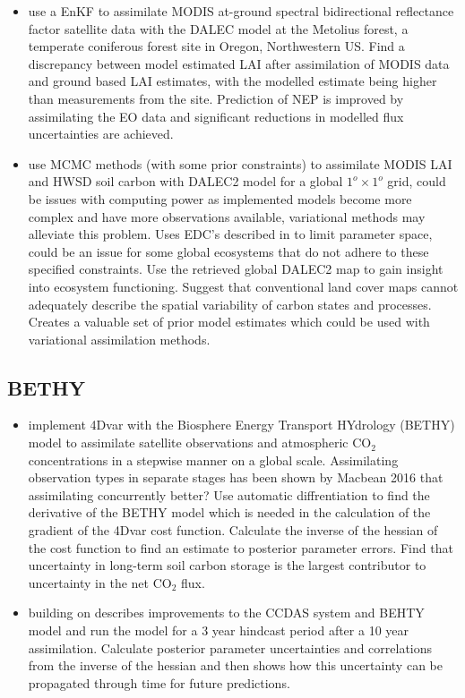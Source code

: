 \documentclass[12pt, a4paper]{article}
\begin{document}
\begin{itemize}
\item \citet{Quaife2008} use a EnKF to assimilate MODIS at-ground spectral bidirectional reflectance factor satellite data with the DALEC model at the Metolius forest, a temperate coniferous forest site in Oregon, Northwestern US. Find a discrepancy between model estimated LAI after assimilation of MODIS data and ground based LAI estimates, with the modelled estimate being higher than measurements from the site. Prediction of NEP is improved by assimilating the EO data and significant reductions in modelled flux uncertainties are achieved.    

\item \citet{bloom2016decadal} use MCMC methods (with some prior constraints) to assimilate MODIS LAI and HWSD soil carbon with DALEC2 model for a global \(1^o \times 1^o\) grid, could be issues with computing power as implemented models become more complex and have more observations available, variational methods may alleviate this problem. Uses EDC's described in \citet{Bloom2015} to limit parameter space, could be an issue for some global ecosystems that do not adhere to these specified constraints. Use the retrieved global DALEC2 map to gain insight into ecosystem functioning. Suggest that conventional land cover maps cannot adequately describe  the spatial variability of carbon states and processes. Creates a valuable set of prior model estimates which could be used with variational assimilation methods.

\end{itemize}


\subsection{BETHY}

\begin{itemize}

\item \citet{rayner2005two} implement 4Dvar with the Biosphere Energy Transport HYdrology (BETHY) model \citep{knorr2001uncertainties} to assimilate satellite observations and atmospheric CO\(_2\) concentrations in a stepwise manner on a global scale. Assimilating observation types in separate stages has been shown by Macbean 2016 that assimilating concurrently better? Use automatic diffrentiation to find the derivative of the BETHY model which is needed in the calculation of the gradient of the 4Dvar cost function. Calculate the inverse of the hessian of the cost function to find an estimate to posterior parameter errors. Find that uncertainty in long-term soil carbon storage is the largest contributor to uncertainty in the net CO\(_2\) flux.

\item \citet{scholze2007propagating} building on  \citet{rayner2005two} describes improvements to the CCDAS system and BEHTY model and run the model for a 3 year hindcast period after a 10 year assimilation. Calculate posterior parameter uncertainties and correlations from the inverse of the hessian and then shows how this uncertainty can be propagated through time for future predictions.   

\end{itemize}
\end{document}
